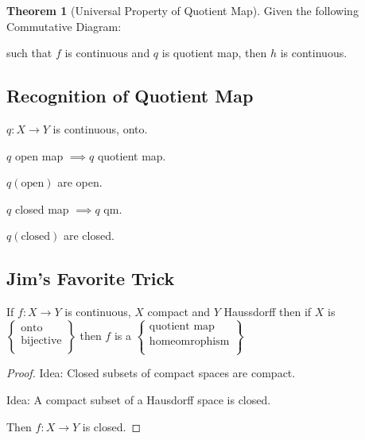 \documentclass{article}
\theoremstyle{definition}
\newtheorem{theorem}{Theorem}
\begin{document}
    \begin{theorem}
        [Universal Property of Quotient Map]

        Given the following Commutative Diagram:

        \begin{center}
        \end{center}

        such that \(f\) is continuous and \(q\) is quotient map, then \(h\) is continuous.
    \end{theorem}

    \subsection*{Recognition of Quotient Map}

    \(q: X \to Y\) is continuous, onto.

    \(q\) open map \(\implies q\) quotient map.

    \(q(\text{open})\) are open.
    
    \(q\) closed map \(\implies q\) qm.

    \(q(\text{closed})\) are closed.
    
    \subsection*{Jim's Favorite Trick}

    If \(f: X \to Y\) is continuous, \(X\) compact and \(Y\) Haussdorff then if \(X\) is \(\begin{Bmatrix}
        \text{onto} \\
        \text{bijective}  \\
    \end{Bmatrix} \) then \(f\) is a \(\begin{Bmatrix}
        \text{quotient map} \\
        \text{homeomrophism}  \\
    \end{Bmatrix} \)  

    \begin{proof}
        Idea: Closed subsets of compact spaces are compact.

        Idea: A compact subset of a Hausdorff space is closed.

        Then \(f: X \to Y\) is closed.
    \end{proof}
\end{document}
